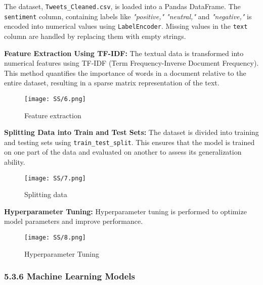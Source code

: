 \documentclass[journal]{IEEEtran}
\begin{document}
The dataset, \texttt{Tweets\_Cleaned.csv}, is loaded into a Pandas DataFrame. The \texttt{sentiment} column, containing labels like \textit{"positive," "neutral,"} and \textit{"negative,"} is encoded into numerical values using \texttt{LabelEncoder}. Missing values in the \texttt{text} column are handled by replacing them with empty strings.

\textbf{Feature Extraction Using TF-IDF:}
The textual data is transformed into numerical features using TF-IDF (Term Frequency-Inverse Document Frequency). This method quantifies the importance of words in a document relative to the entire dataset, resulting in a sparse matrix representation of the text.
\begin{figure}[H]
\centering
\texttt{[image: SS/6.png]}
\caption{Feature extraction}
\end{figure}
\textbf{Splitting Data into Train and Test Sets:}
The dataset is divided into training and testing sets using \texttt{train\_test\_split}. This ensures that the model is trained on one part of the data and evaluated on another to assess its generalization ability.
\begin{figure}[H]
\centering
\texttt{[image: SS/7.png]}
\caption{Splitting data}
\end{figure}
\textbf{Hyperparameter Tuning:}
Hyperparameter tuning is performed to optimize model parameters and improve performance.
\begin{figure}[H]
\centering
\texttt{[image: SS/8.png]}
\caption{Hyperparameter Tuning}
\end{figure}
\subsubsection*{\textbf{5.3.6 Machine Learning Models}}
\end{document}
